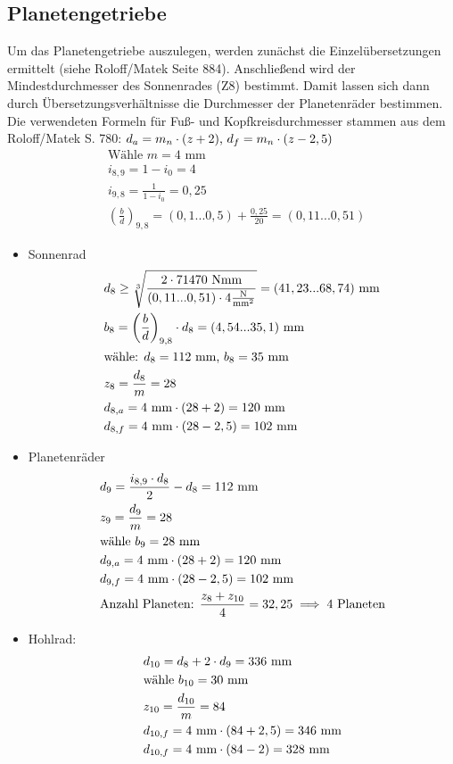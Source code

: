 \subsection{Planetengetriebe}
Um das Planetengetriebe auszulegen, werden zunächst die Einzelübersetzungen ermittelt (siehe Roloff/Matek Seite 884). Anschließend wird der Mindestdurchmesser des Sonnenrades (Z8) bestimmt. Damit lassen sich dann durch Übersetzungsverhältnisse die Durchmesser der Planetenräder bestimmen. 
\newpage
Die verwendeten Formeln für Fuß- und Kopfkreisdurchmesser stammen aus dem Roloff/Matek S. 780: $d_a = m_n \cdot (z + 2) \text{, } d_f = m_n \cdot (z-2,5) $
\begin{align*}
	&\text{Wähle } m=4  \text{ mm} \\
	&i_{8,9} = 1 - i_0 = 4 \\
	&i_{9,8} = \frac{1}{1-i_0}  = 0,25 \\
	& \left(\frac{b}{d} \right) _{9,8} = (0,1...0,5) + \frac{0,25}{20}  =  (0,11...0,51) 
\end{align*}
\begin{itemize}
\item Sonnenrad
\begin{align*}
	&d_8 \ge \sqrt[3]{\frac{2 \cdot 71470 \text{ Nmm}}{(0,11...0,51) \cdot  4 \frac{\text{N}}{\text{mm}^2}}}= (41,23...68,74) \text{ mm}\\
	&b_8= \left(\frac{b}{d} \right) _{9,8}  \cdot d_8 = (4,54...35,1) \text{ mm}  \\
	&\text{wähle: } d_8 = 112 \text{ mm, } b_8 = 35 \text{ mm}  \\
	&z_8 = \frac{d_8}{m} = 28 \\
	&d_{8,a} = 4\text{ mm} \cdot (28+2) =120\text{ mm} \\
	&d_{8,f} = 4\text{ mm} \cdot (28-2,5) =102\text{ mm} 
\end{align*}
\item Planetenräder 
\begin{align*}
	&d_9 = \frac{i_{8,9} \cdot d_8}{2 } - d_8 = 112 \text{ mm}  \\
	&z_9 = \frac{d_9}{m} = 28 \\
	&\text{wähle }  b_9 = 28 \text{ mm}  \\
	&d_{9,a} = 4\text{ mm} \cdot (28+2) =120\text{ mm} \\
	&d_{9,f} = 4\text{ mm} \cdot (28-2,5) =102\text{ mm} \\ 
	&\text{Anzahl Planeten: } \frac{z_{8} + z_{10}}{4} = 32,25 \implies 4 \text{ Planeten} 
\end{align*}	
\item Hohlrad:
\begin{align*}
	&d_{10} = d_8 + 2\cdot d_9 = 336 \text{ mm}  \\
	&\text{wähle }  b_{10} = 30 \text{ mm}  \\
	&z_{10}  = \frac{d_{10}}{m} = 84 \\
	&d_{10,f} = 4\text{ mm} \cdot (84+2,5) =346\text{ mm} \\
	&d_{10,f} = 4\text{ mm} \cdot (84-2) =328\text{ mm} 
\end{align*}	
\end{itemize}
